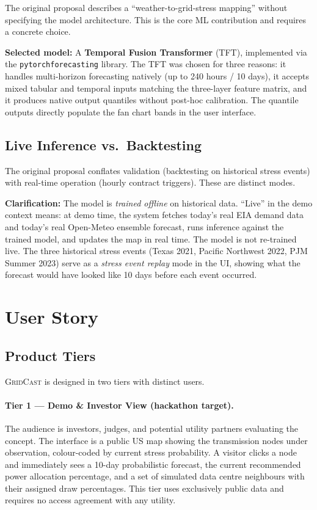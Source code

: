 \documentclass[10pt,letterpaper]{article}
\newcommand{\gridcast}{\textsc{GridCast}\xspace}
\newcommand{\tft}{\textsc{TFT}\xspace}
\begin{document}
The original proposal describes a ``weather-to-grid-stress mapping'' without specifying
the model architecture. This is the core ML contribution and requires a concrete choice.

\textbf{Selected model:} A \textbf{Temporal Fusion Transformer} (\tft), implemented
via the \texttt{pytorch\discretionary{-}{}{-}forecasting} library. The \tft was chosen for three reasons: it
handles multi-horizon forecasting natively (up to 240 hours / 10 days), it accepts mixed
tabular and temporal inputs matching the three-layer feature matrix, and it produces
native output quantiles without post-hoc calibration. The quantile outputs directly
populate the fan chart bands in the user interface.

\subsection{Live Inference vs.\ Backtesting}

The original proposal conflates validation (backtesting on historical stress events)
with real-time operation (hourly contract triggers). These are distinct modes.

\textbf{Clarification:} The model is \emph{trained offline} on historical data.
``Live'' in the demo context means: at demo time, the system fetches today's real EIA
demand data and today's real Open-Meteo ensemble forecast, runs inference against the
trained model, and updates the map in real time. The model is not re-trained live.
The three historical stress events (Texas 2021, Pacific Northwest 2022, PJM Summer 2023)
serve as a \emph{stress event replay} mode in the UI, showing what the forecast would
have looked like 10 days before each event occurred.

\section{User Story}

\subsection{Product Tiers}

\gridcast is designed in two tiers with distinct users.

\paragraph{Tier 1 --- Demo \& Investor View (hackathon target).}
The audience is investors, judges, and potential utility partners evaluating the concept.
The interface is a public US map showing the transmission nodes under observation,
colour-coded by current stress probability. A visitor clicks a node and immediately sees
a 10-day probabilistic forecast, the current recommended power allocation percentage,
and a set of simulated data centre neighbours with their assigned draw percentages.
This tier uses exclusively public data and requires no access agreement with any utility.
\end{document}
